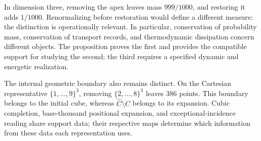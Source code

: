 In dimension three, removing the apex leaves mass \(999/1000\), and
restoring it adds \(1/1000\). Renormalizing before restoration would
define a different measure: the distinction is operationally relevant.
In particular, conservation of probability mass, conservation of transport
records, and thermodynamic dissipation concern different objects. The
proposition proves the first and provides the compatible support for
studying the second; the third requires a specified dynamic and energetic realization.

The internal geometric boundary also remains distinct.
On the Cartesian representative \(\{1,\ldots,9\}^3\), removing
\(\{2,\ldots,8\}^3\) leaves \(386\) points. This boundary belongs
to the initial cube, whereas \(\widehat C\setminus C\) belongs to
its expansion. Cubic completion, base-thousand positional expansion,
and exceptional-incidence reading share support data; their respective
maps determine which information from these data each representation uses.
